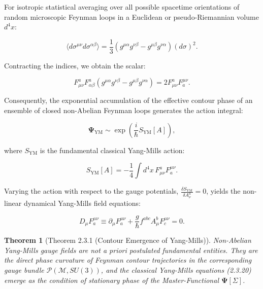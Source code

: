 \documentclass[11pt,a4paper]{article}
\newtheorem{theorem}{Theorem}[section]
\theoremstyle{definition}
\begin{document}
For isotropic statistical averaging over all possible spacetime orientations of random microscopic Feynman loops in a Euclidean or pseudo-Riemannian volume $d^4x$:

\begin{equation}\label{eq:2.3.16}\tag{2.3.16}
\langle d\sigma^{\mu\nu} d\sigma^{\alpha\beta} \rangle = \frac{1}{3} \left( g^{\mu\alpha} g^{\nu\beta} - g^{\mu\beta} g^{\nu\alpha} \right) (d\sigma)^2.
\end{equation}

Contracting the indices, we obtain the scalar:

\begin{equation}\label{eq:2.3.17}\tag{2.3.17}
F_{\mu\nu}^a F_{\alpha\beta}^a \left( g^{\mu\alpha} g^{\nu\beta} - g^{\mu\beta} g^{\nu\alpha} \right) = 2 F_{\mu\nu}^a F^{\mu\nu}_a.
\end{equation}

Consequently, the exponential accumulation of the effective contour phase of an ensemble of closed non-Abelian Feynman loops generates the action integral:

\begin{equation}\label{eq:2.3.18}\tag{2.3.18}
\mathbf{\Psi}_{\text{YM}} \sim \exp\left( \frac{i}{\hbar} S_{\text{YM}}[A] \right),
\end{equation}

where $S_{\text{YM}}$ is the fundamental classical Yang-Mills action:

\begin{equation}\label{eq:2.3.19}\tag{2.3.19}
S_{\text{YM}}[A] = -\frac{1}{4} \int d^4x \, F_{\mu\nu}^a F^{\mu\nu}_a.
\end{equation}

Varying the action with respect to the gauge potentials, $\frac{\delta S_{\text{YM}}}{\delta A_\nu^a} = 0$, yields the non-linear dynamical Yang-Mills field equations:

\begin{equation}\label{eq:2.3.20}\tag{2.3.20}
D_\mu F^{\mu\nu}_a \equiv \partial_\mu F^{\mu\nu}_a + \frac{g}{\hbar} f^{abc} A_\mu^b F^{\mu\nu}_c = 0.
\end{equation}

\begin{theorem}[Theorem 2.3.1 (Contour Emergence of Yang-Mills)]\label{thm:2.3.1}
Non-Abelian Yang-Mills gauge fields are not a priori postulated fundamental entities. They are the direct phase curvature of Feynman contour trajectories in the corresponding gauge bundle $\mathcal{P}(\mathcal{M}, SU(3))$, and the classical Yang-Mills equations (2.3.20) emerge as the condition of stationary phase of the Master-Functional $\mathbf{\Psi}[\Sigma]$.
\end{theorem}
\end{document}
